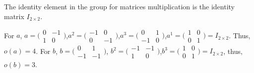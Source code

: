 \documentclass[12pt]{article}
\begin{document}
\subsection{} %
\subsection{} %
The identity element in the group for matrices multiplication is the identity matrix $I_{2\times2}$.

For $a$, $a=\big(\begin{smallmatrix}0 & -1\\1 & 0\end{smallmatrix}\big)$,$a^2=\big(\begin{smallmatrix}-1 & 0\\0 & -1\end{smallmatrix}\big)$,$a^3=\big(\begin{smallmatrix}0 & 1\\-1 & 0\end{smallmatrix}\big)$,$a^1=\big(\begin{smallmatrix}1 & 0\\0 & 1\end{smallmatrix}\big)=I_{2\times2}$. Thus, $o(a)=4$. For $b$, $b=\big(\begin{smallmatrix}0 & 1\\-1 & -1\end{smallmatrix}\big)$, $b^2=\big(\begin{smallmatrix}-1 & -1\\1 & 0\end{smallmatrix}\big)$,$b^3=\big(\begin{smallmatrix}1 & 0\\0 & 1\end{smallmatrix}\big)=I_{2\times2}$, thus, $o(b)=3$.










\newpage
\section{} %
\subsection{} %
\subsection{} %
\end{document}
